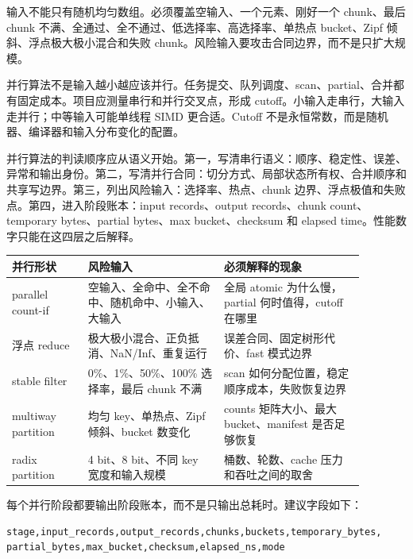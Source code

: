 输入不能只有随机均匀数组。必须覆盖空输入、一个元素、刚好一个 chunk、最后 chunk 不满、全通过、全不通过、低选择率、高选择率、单热点 bucket、Zipf 倾斜、浮点极大极小混合和失败 chunk。风险输入要攻击合同边界，而不是只扩大规模。

并行算法不是输入越小越应该并行。任务提交、队列调度、scan、partial、合并都有固定成本。项目应测量串行和并行交叉点，形成 cutoff。小输入走串行，大输入走并行；中等输入可能单线程 SIMD 更合适。Cutoff 不是永恒常数，而是随机器、编译器和输入分布变化的配置。

并行算法的判读顺序应从语义开始。第一，写清串行语义：顺序、稳定性、误差、异常和输出身份。第二，写清并行合同：切分方式、局部状态所有权、合并顺序和共享写边界。第三，列出风险输入：选择率、热点、chunk 边界、浮点极值和失败点。第四，进入阶段账本：input records、output records、chunk count、temporary bytes、partial bytes、max bucket、checksum 和 elapsed time。性能数字只能在这四层之后解释。

\begin{center}
\begin{tabular}{p{0.19\linewidth}p{0.34\linewidth}p{0.35\linewidth}}
\toprule
并行形状 & 风险输入 & 必须解释的现象 \\
\midrule
parallel count-if & 空输入、全命中、全不命中、随机命中、小输入、大输入 & 全局 atomic 为什么慢，partial 何时值得，cutoff 在哪里 \\
浮点 reduce & 极大极小混合、正负抵消、NaN/Inf、重复运行 & 误差合同、固定树形代价、fast 模式边界 \\
stable filter & 0\%、1\%、50\%、100\% 选择率，最后 chunk 不满 & scan 如何分配位置，稳定顺序成本，失败恢复边界 \\
multiway partition & 均匀 key、单热点、Zipf 倾斜、bucket 数变化 & counts 矩阵大小、最大 bucket、manifest 是否足够恢复 \\
radix partition & 4 bit、8 bit、不同 key 宽度和输入规模 & 桶数、轮数、cache 压力和吞吐之间的取舍 \\
\bottomrule
\end{tabular}
\end{center}

每个并行阶段都要输出阶段账本，而不是只输出总耗时。建议字段如下：

\begin{lstlisting}[caption={并行算法阶段账本字段}]
stage,input_records,output_records,chunks,buckets,temporary_bytes,
partial_bytes,max_bucket,checksum,elapsed_ns,mode
\end{lstlisting}

